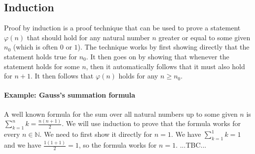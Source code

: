 



\subsection{Induction}
Proof by induction is a proof technique that can be used to prove a statement $\varphi(n)$ that should hold for any natural number $n$ greater or equal to some given $n_0$ (which is often $0$ or $1$). The technique works by first showing directly that the statement holds true for $n_0$. It then goes on by showing that whenever the statement holds for some $n$, then it automatically follows that it must also hold for $n+1$. It then follows that $\varphi(n)$ holds for any $n \geq n_0$.

\paragraph{Example: Gauss's summation formula} A well known formula for the sum over all natural numbers up to some given $n$ is $\sum_{k=1}^n k = \frac{n (n+1)}{2}$. We will use induction to prove that the formula works for every $n \in \mathbb{N}$. We need to first show it directly for $n=1$. We have $\sum_{k=1}^1 k = 1$ and we have $\frac{1 (1+1)}{2} = 1$, so the formula works for $n=1$. ...TBC...




